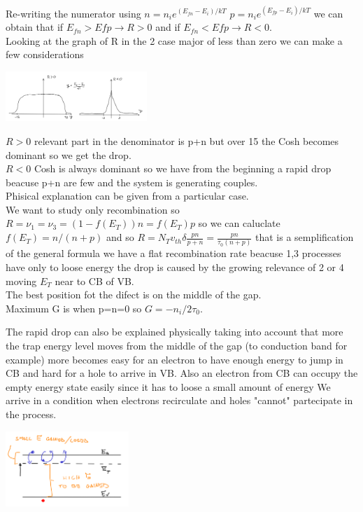 Re-writing the numerator using $n=n_ie^{(E_{fn}-E_i)/kT}$ $p=n_ie^{(E_{fp}-E_i)/kT}$ we can obtain that if $E_{fn}>E{fp}\rightarrow R>0$ and if $E_{fn}<E{fp}\rightarrow R<0$.\\
\vspace{5mm}
Looking at the graph of R in the 2 case major of less than zero we can make a few considerations

\centering
\includegraphics[width=0.4\textwidth]{RG.png}\\
\raggedright

\tab $R>0$ relevant part in the denominator is p+n but over 15 the Cosh becomes dominant so we get the drop.\\
\tab $R<0$ Cosh is always dominant so we have from the beginning a rapid drop beacuse p+n are few and the system is generating couples.\\
\vspace{5mm}
Phisical explanation can be given from a particular case.\\
We want to study only recombination so $R=\nu_1=\nu_3=(1-f(E_T))n=f(E_T)p$ so we can caluclate $f(E_T)=n/(n+p)$ and so $R=N_Tv_{th}\delta \frac{pn}{p+n}=\frac{pn}{\tau_0(n+p)}$ that is a semplification of the general formula we have a flat recombination rate beacuse 1,3 processes have only to loose energy the drop is caused by the growing relevance of 2 or 4 moving $E_T$ near to CB of VB.\\
The best position fot the difect is on the middle of the gap.\\
Maximum G is when p=n=0 so $G=-n_i/2\tau_0$.\\

\vspace{5mm}

The rapid drop can also be explained physically taking into account that more the trap energy level moves from the middle of the gap (to conduction band for example) more becomes easy for an electron to have enough energy to jump in CB and hard for a hole to arrive in VB. Also an electron from CB can occupy the empty energy state easily since it has to loose a small amount of energy 
We arrive in a condition when electrons recirculate and holes "cannot" partecipate in the process.


\centering
\includegraphics[width=0.35\textwidth]{Grate.png}\\
\raggedright


